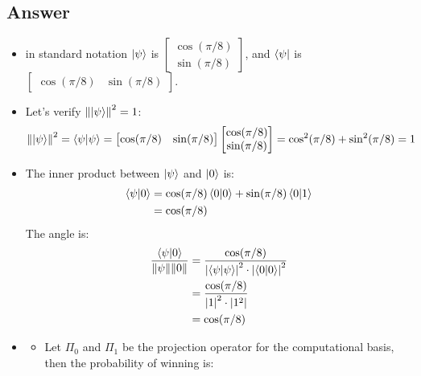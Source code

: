 \subsection*{Answer}\label{subsec:answer-01}
\begin{itemize}
    \item[a)] in standard notation $\ket{\psi}$ is $\begin{bmatrix} \cos(\pi/8) \\ \sin(\pi/8) \end{bmatrix}$, and $\bra{\psi}$ is $\begin{bmatrix} \cos(\pi/8) & \sin(\pi/8) \end{bmatrix}$.
    \item[b)] Let's verify $\norm{\ket{\psi}}^2=1$:\\
     \begin{equation*}
         \norm{\ket{\psi}}^2 = \braket{\psi}{\psi} = \begin{bmatrix} \cos(\pi/8) & \sin(\pi/8) \end{bmatrix} \begin{bmatrix} \cos(\pi/8) \\ \sin(\pi/8) \end{bmatrix} = \cos^2(\pi/8) + \sin^2(\pi/8) = 1
     \end{equation*}
    \item[c)] The inner product between $\ket{\psi}$ and $\ket{0}$ is:\\
        \begin{align*}
            \braket{\psi}{0}
            &= \cos(\pi/8)\braket{0}{0} + \sin(\pi/8)\braket{0}{1}\\
            &= \cos(\pi/8)
        \end{align*}
        The angle is:
        \begin{align*}
                \frac{\braket{\psi}{0}}{\norm{\psi}\norm{0}}
                &= \frac{\cos(\pi/8)}{\abs{\braket{\psi}{\psi}}^2\cdot\abs{\braket{0}{0}}^2}\\
                &= \frac{\cos(\pi/8)}{\abs{1}^2\cdot\abs{1^2}}\\
                &= \cos(\pi/8)
            \end{align*}
    \item[d)]
        \begin{itemize}
            \item[(a)] Let $\Pi_0$ and $\Pi_1$ be the projection operator for the computational basis, then the probability of winning is:
            \begin{align*}

\end{align*}
\end{itemize}
\end{itemize}

